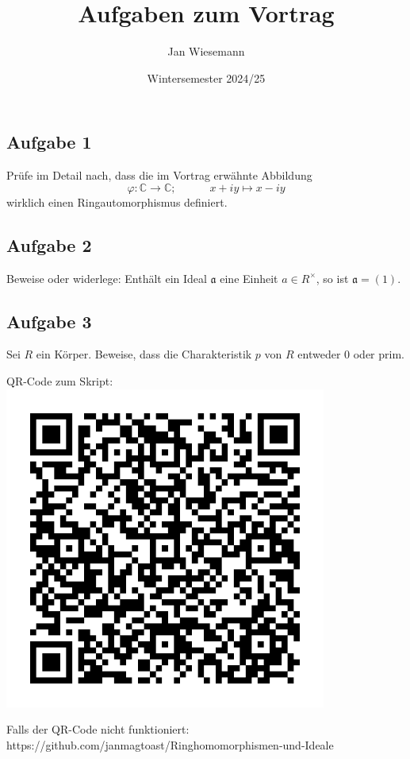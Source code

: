 \documentclass[12pt]{article}
\begin{document}
\title{\bf{Aufgaben zum Vortrag}}
\author{Jan Wiesemann}
\date{Wintersemester 2024/25}
\maketitle

\subsection*{Aufgabe 1}
Prüfe im Detail nach, dass die im Vortrag erwähnte Abbildung
\[\varphi: \mathbb C\to\mathbb C; \hspace{3em} x+iy \longmapsto x-iy\]
wirklich einen Ringautomorphismus definiert.

\subsection*{Aufgabe 2}
Beweise oder widerlege: Enthält ein Ideal $\mathfrak a$ eine Einheit $a\in R^\times$, so ist $\mathfrak a=(1)$.

\subsection*{Aufgabe 3}
Sei $R$ ein Körper. Beweise, dass die Charakteristik $p$ von $R$ entweder 0 oder prim.

\vspace{2.5em}
QR-Code zum Skript:
\vspace{-1.5em}
\center\includegraphics{qr.pdf}

\raggedright
Falls der QR-Code nicht funktioniert:
https://github.com/janmagtoast/Ringhomomorphismen-und-Ideale
\end{document}
